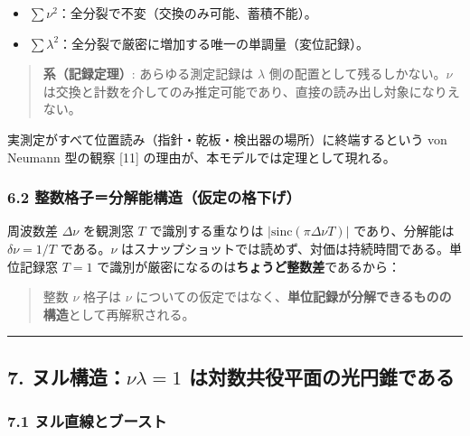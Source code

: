 \documentclass[
]{ltjsarticle}
\providecommand{\tightlist}{%
  \setlength{\itemsep}{0pt}\setlength{\parskip}{0pt}}
\begin{document}
\begin{itemize}
\tightlist
\item
  \(\sum\nu^2\)：全分裂で不変（交換のみ可能、蓄積不能）。
\item
  \(\sum\lambda^2\)：全分裂で厳密に増加する唯一の単調量（変位記録）。
\end{itemize}

\begin{quote}
\textbf{系（記録定理）}: あらゆる測定記録は \(\lambda\)
側の配置として残るしかない。\(\nu\)
は交換と計数を介してのみ推定可能であり、直接の読み出し対象になりえない。
\end{quote}

実測定がすべて位置読み（指針・乾板・検出器の場所）に終端するという von
Neumann 型の観察 {[}11{]} の理由が、本モデルでは定理として現れる。

\subsubsection{6.2
整数格子＝分解能構造（仮定の格下げ）}\label{ux6574ux6570ux683cux5b50ux5206ux89e3ux80fdux69cbux9020ux4eeeux5b9aux306eux683cux4e0bux3052}

周波数差 \(\Delta\nu\) を観測窓 \(T\) で識別する重なりは
\(|\mathrm{sinc}(\pi\Delta\nu T)|\) であり、分解能は \(\delta\nu=1/T\)
である。\(\nu\)
はスナップショットでは読めず、対価は持続時間である。単位記録窓 \(T=1\)
で識別が厳密になるのは\textbf{ちょうど整数差}であるから：

\begin{quote}
整数 \(\nu\) 格子は \(\nu\)
についての仮定ではなく、\textbf{単位記録が分解できるものの構造}として再解釈される。
\end{quote}

\begin{center}\rule{0.5\linewidth}{0.5pt}\end{center}

\subsection{\texorpdfstring{7. ヌル構造：\(\nu\lambda=1\)
は対数共役平面の光円錐である}{7. ヌル構造：\textbackslash nu\textbackslash lambda=1 は対数共役平面の光円錐である}}\label{ux30ccux30ebux69cbux9020nulambda1-ux306fux5bfeux6570ux5171ux5f79ux5e73ux9762ux306eux5149ux5186ux9310ux3067ux3042ux308b}

\subsubsection{7.1
ヌル直線とブースト}\label{ux30ccux30ebux76f4ux7ddaux3068ux30d6ux30fcux30b9ux30c8}
\end{document}
